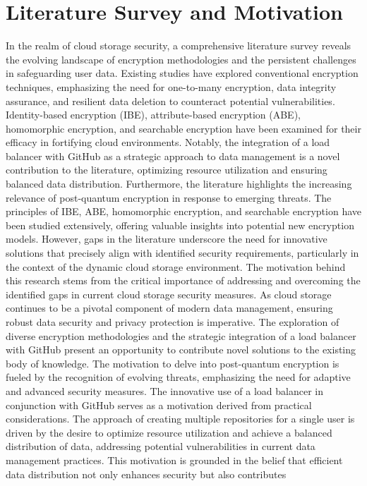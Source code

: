 
\chapter{Literature Survey and Motivation}
In the realm of cloud storage security, a comprehensive literature survey reveals the evolving
landscape of encryption methodologies and the persistent challenges in safeguarding user data.
Existing studies have explored conventional encryption techniques, emphasizing the need for one-to-many encryption, data integrity assurance, and resilient data deletion to counteract potential
vulnerabilities. Identity-based encryption (IBE), attribute-based encryption (ABE), homomorphic
encryption, and searchable encryption have been examined for their efficacy in fortifying cloud
environments. Notably, the integration of a load balancer with GitHub as a strategic approach to
data management is a novel contribution to the literature, optimizing resource utilization and
ensuring balanced data distribution.
Furthermore, the literature highlights the increasing relevance of post-quantum encryption in
response to emerging threats. The principles of IBE, ABE, homomorphic encryption, and searchable
encryption have been studied extensively, offering valuable insights into potential new encryption
models. However, gaps in the literature underscore the need for innovative solutions that precisely
align with identified security requirements, particularly in the context of the dynamic cloud storage
environment.
The motivation behind this research stems from the critical importance of addressing and
overcoming the identified gaps in current cloud storage security measures. As cloud storage
continues to be a pivotal component of modern data management, ensuring robust data security and
privacy protection is imperative. The exploration of diverse encryption methodologies and the
strategic integration of a load balancer with GitHub present an opportunity to contribute novel
solutions to the existing body of knowledge. The motivation to delve into post-quantum encryption
is fueled by the recognition of evolving threats, emphasizing the need for adaptive and advanced
security measures.
The innovative use of a load balancer in conjunction with GitHub serves as a motivation derived
from practical considerations. The approach of creating multiple repositories for a single user is
driven by the desire to optimize resource utilization and achieve a balanced distribution of data,
addressing potential vulnerabilities in current data management practices. This motivation is
grounded in the belief that efficient data distribution not only enhances security but also contributes
